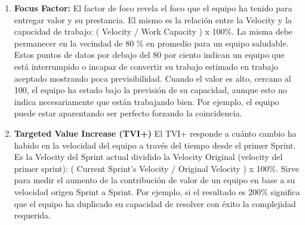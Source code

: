\begin{enumerate}
{  \begin{enumerate}
  
  \item {\textbf{Capacidad en puntos ideales:} La capacidad puede ser una idealización basada en la velocidad promedio, o sea, los puntos de la historia que se pueden considerar gastar en la próxima carrera de velocidad.\footnote{\cite{Satish-Thatte-2013}}}

  \item {\textbf{Capacidad en horas:} La capacidad puede ser calculada en horas basados en la cantidad de miembros y la cantidad de horas efectivas de trabajo en un Sprint. Por ejemplo en un equipo de 8 miembros, con 6 horas de trabajo efectivo y un Sprint de 10 días, la capacidad en horas es igual a 480 hs (8 x 6 hs x 10).}

  \end{enumerate}

Cuando se definió el marco de trabajo, como algo mínimo de cosas para que funcione, se dejó lo más simple posible. Debido a ello, el concepto de Velocity sí es partes del marco de trabajo, pero Working capacity no lo es, aunque es ampliamente usado \footnote{Erich Buhler, Agilib.org 2015, Proyecto Mercury 2015 (LAN), \cite{Erich-Buhler-Coach-2015}.}.
}

\item {\textbf{Focus Factor:} El factor de foco revela el foco que el equipo ha tenido para entregar valor y su prestancia. El mismo es la relación entre la Velocity y la capacidad de trabajo: ( Velocity / Work Capacity ) x 100\%. La misma debe permanecer en la vecindad de 80 \% en promedio para un equipo saludable. Estos puntos de datos por debajo del 80 por ciento indican un equipo que está interrumpido o incapaz de convertir su trabajo estimado en trabajo aceptado mostrando poca previsibilidad. Cuando el valor es alto, cercano al 100, el equipo ha estado bajo la previsión de su capacidad, aunque esto no indica necesariamente que están trabajando bien. Por ejemplo, el equipo puede estar aparentando ser perfecto forzando la coincidencia.}

\item {\textbf{Targeted Value Increase (TVI+)} El TVI+ responde a cuánto cambio ha habido en la velocidad del equipo a través del tiempo desde el primer Sprint. Es la Velocity del Sprint actual dividido la Velocity Original (velocity del primer sprint): ( Current Sprint’s Velocity / Original Velocity ) x 100\%. Sirve para medir el aumento de la contribución de valor de un equipo en base a su velocidad origen Sprint a Sprint.
Por ejemplo, si el resultado es 200\% significa que el equipo ha duplicado su capacidad de resolver con éxito la complejidad requerida.
}


\end{enumerate}
